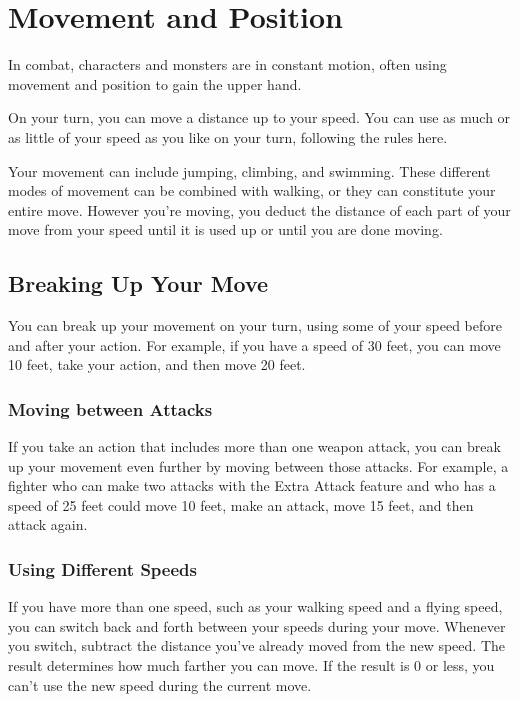 \section{Movement and Position}
\label{sec:movement-and-position}

In combat, characters and monsters are in constant motion, often using movement and position to gain the upper hand.

On your turn, you can move a distance up to your speed. You can use as much or as little of your speed as you like on your turn, following the rules here.

Your movement can include jumping, climbing, and swimming. These different modes of movement can be combined with walking, or they can constitute your entire move. However you're moving, you deduct the distance of each part of your move from your speed until it is used up or until you are done moving.

\subsection{Breaking Up Your Move}

You can break up your movement on your turn, using some of your speed before and after your action. For example, if you have a speed of 30 feet, you can move 10 feet, take your action, and then move 20 feet.

\subsubsection{Moving between Attacks}

If you take an action that includes more than one weapon attack, you can break up your movement even further by moving between those attacks. For example, a fighter who can make two attacks with the Extra Attack feature and who has a speed of 25 feet could move 10 feet, make an attack, move 15 feet, and then attack again.

\subsubsection{Using Different Speeds}

If you have more than one speed, such as your walking speed and a flying speed, you can switch back and forth between your speeds during your move. Whenever you switch, subtract the distance you've already moved from the new speed. The result determines how much farther you can move. If the result is 0 or less, you can't use the new speed during the current move.

